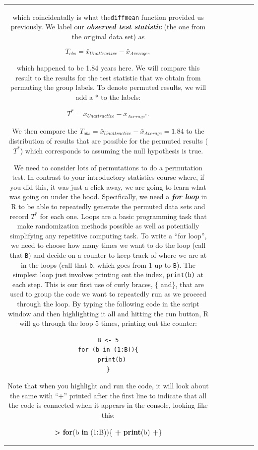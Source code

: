 \documentclass[]{book}
\newenvironment{Shaded}{\begin{snugshade}}{\end{snugshade}}
\newcommand{\KeywordTok}[1]{\textcolor[rgb]{0.13,0.29,0.53}{\textbf{#1}}}
\newcommand{\DecValTok}[1]{\textcolor[rgb]{0.00,0.00,0.81}{#1}}
\newcommand{\StringTok}[1]{\textcolor[rgb]{0.31,0.60,0.02}{#1}}
\newcommand{\ControlFlowTok}[1]{\textcolor[rgb]{0.13,0.29,0.53}{\textbf{#1}}}
\newcommand{\OperatorTok}[1]{\textcolor[rgb]{0.81,0.36,0.00}{\textbf{#1}}}
\newcommand{\NormalTok}[1]{#1}
\theoremstyle{definition}
\theoremstyle{definition}
\theoremstyle{remark}
\begin{document}
\begin{longtable}[]{@{}ccccccc@{}}
\begin{minipage}[b]{0.10\columnwidth}
which coincidentally is what the\texttt{diffmean} function provided us
previously. We label our \textbf{\emph{observed test statistic}} (the
one from the original data set) as

\[T_{obs}=\bar{x}_{Unattractive}-\bar{x}_{Average},\]

which happened to be 1.84 years here. We will compare this result to the
results for the test statistic that we obtain from permuting the group
labels. To denote permuted results, we will add a * to the labels:

\[T^*=\bar{x}_{Unattractive}-\bar{x}_{Average^*}.\]

We then compare the
\(T_{obs}=\bar{x}_{Unattractive}-\bar{x}_{Average} = 1.84\) to the
distribution of results that are possible for the permuted results
(\(T^*\)) which corresponds to assuming the null hypothesis is true.

We need to consider lots of permutations to do a permutation test. In
contrast to your introductory statistics course where, if you did this,
it was just a click away, we are going to learn what was going on under
the hood. Specifically, we need a \textbf{\emph{for loop}} in R to be
able to repeatedly generate the permuted data sets and record \(T^*\)
for each one. Loops are a basic programming task that make randomization
methods possible as well as potentially simplifying any repetitive
computing task. To write a ``for loop'', we need to choose how many
times we want to do the loop (call that \texttt{B}) and decide on a
counter to keep track of where we are at in the loops (call that
\texttt{b}, which goes from 1 up to \texttt{B}). The simplest loop just
involves printing out the index, \texttt{print(b)} at each step. This is
our first use of curly braces, \{ and\}, that are used to group the code
we want to repeatedly run as we proceed through the loop. By typing the
following code in the script window and then highlighting it all and
hitting the run button, R will go through the loop 5 times, printing out
the counter:

\begin{verbatim}
B <- 5
for (b in (1:B)){
  print(b)
}
\end{verbatim}

Note that when you highlight and run the code, it will look about the
same with ``+'' printed after the first line to indicate that all the
code is connected when it appears in the console, looking like this:

\begin{Shaded}
\begin{Highlighting}[]
\OperatorTok{>}\StringTok{ }\ControlFlowTok{for}\NormalTok{(b }\ControlFlowTok{in}\NormalTok{ (}\DecValTok{1}\OperatorTok{:}\NormalTok{B))\{}
\OperatorTok{+}\StringTok{   }\KeywordTok{print}\NormalTok{(b)}
\OperatorTok{+}\NormalTok{\}}
\end{Highlighting}
\end{Shaded}


\end{minipage}
\end{longtable}
\end{document}
